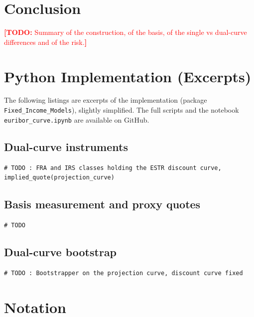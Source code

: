 \documentclass[11pt,a4paper]{article}
\theoremstyle{plain}
\theoremstyle{definition}
\newcommand{\todo}[1]{\textcolor{red}{\textbf{[TODO:} #1\textbf{]}}}
\begin{document}
\section{Conclusion}
\label{sec:conclusion}

\todo{Summary of the construction, of the basis, of the single vs dual-curve differences and of the risk.}

\clearpage

\appendix
\section{Python Implementation (Excerpts)}
\label{app:code}

The following listings are excerpts of the implementation (package \texttt{Fixed\_Income\_Models}), slightly simplified. The full scripts and the notebook \texttt{euribor\_curve.ipynb} are available on GitHub.

\subsection{Dual-curve instruments}
\begin{lstlisting}[style=pystyle]
# TODO : FRA and IRS classes holding the ESTR discount curve, implied_quote(projection_curve)
\end{lstlisting}

\subsection{Basis measurement and proxy quotes}
\begin{lstlisting}[style=pystyle]
# TODO
\end{lstlisting}

\subsection{Dual-curve bootstrap}
\begin{lstlisting}[style=pystyle]
# TODO : Bootstrapper on the projection curve, discount curve fixed
\end{lstlisting}

\section{Notation}
\label{app:notation}
\end{document}
